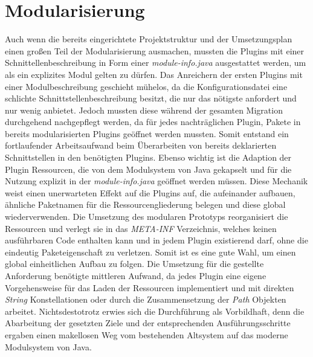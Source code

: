 \section{Modularisierung}
Auch wenn die bereits eingerichtete Projektstruktur und der Umsetzungsplan einen großen Teil der Modularisierung ausmachen, mussten die Plugins mit einer Schnittellenbeschreibung in Form einer \textit{module-info.java} ausgestattet werden, um als ein explizites Modul gelten zu dürfen. Das Anreichern der ersten Plugins mit einer Modulbeschreibung geschieht mühelos, da die Konfigurationsdatei eine schlichte Schnittstellenbeschreibung besitzt, die nur das nötigste anfordert und nur wenig anbietet. Jedoch mussten diese während der gesamten Migration durchgehend nachgepflegt werden, da für jedes nachträglichen Plugin, Pakete in bereits modularisierten Plugins geöffnet werden mussten. Somit entstand ein fortlaufender Arbeitsaufwand beim Überarbeiten von bereits deklarierten Schnittstellen in den benötigten Plugins.\newline
Ebenso wichtig ist die Adaption der Plugin Ressourcen, die von dem Modulsystem von Java gekapselt und für die Nutzung explizit in der \textit{module-info.java} geöffnet werden müssen. Diese Mechanik weist einen unerwarteten Effekt auf die Plugins auf, die aufeinander aufbauen, ähnliche Paketnamen für die Ressourcengliederung belegen und diese global wiederverwenden.\newline
Die Umsetzung des modularen Prototyps reorganisiert die Ressourcen und verlegt sie in das \textit{META-INF} Verzeichnis, welches keinen ausführbaren Code enthalten kann und in jedem Plugin existierend darf, ohne die eindeutig Paketeigenschaft zu verletzen. Somit ist es eine gute Wahl, um einen global einheitlichen Aufbau zu folgen. Die Umsetzung für die gestellte Anforderung benötigte mittleren Aufwand, da jedes Plugin eine eigene Vorgehensweise für das Laden der Ressourcen implementiert und mit direkten \textit{String} Konstellationen oder durch die Zusammensetzung der \textit{Path} Objekten arbeitet. \newline
Nichtsdestotrotz erwies sich die Durchführung als Vorbildhaft, denn die Abarbeitung der gesetzten Ziele und der entsprechenden Ausführungsschritte ergaben einen makellosen Weg vom bestehenden Altsystem auf das moderne Modulsystem von Java.\bigbreak

